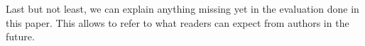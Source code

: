 \documentclass[twocolumn]{article}
\begin{document}
Last but not least, we can explain anything missing yet in the evaluation
done in this paper. This allows to refer to what readers can expect from
authors in the future.

% 


 
\end{document}
